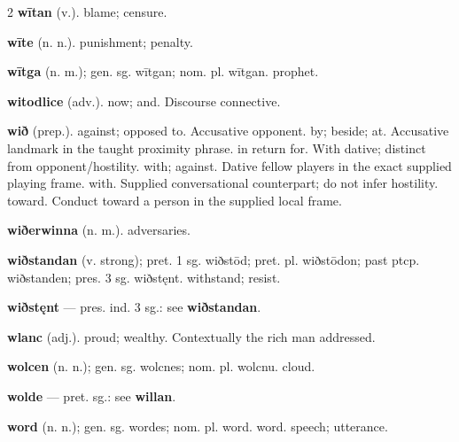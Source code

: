 \begin{multicols*}{2}
\textbf{wītan} (v.). blame; censure.\par
\textbf{wīte} (n. n.). punishment; penalty.\par
\textbf{wītga} (n. m.); gen. sg. wītgan; nom. pl. wītgan. prophet.\par
\textbf{witodlice} (adv.). now; and. Discourse connective.\par
\textbf{wið} (prep.). against; opposed to. Accusative opponent. by; beside; at. Accusative landmark in the taught proximity phrase. in return for. With dative; distinct from opponent/hostility. with; against. Dative fellow players in the exact supplied playing frame. with. Supplied conversational counterpart; do not infer hostility. toward. Conduct toward a person in the supplied local frame.\par
\textbf{wiðerwinna} (n. m.). adversaries.\par
\textbf{wiðstandan} (v. strong); pret. 1 sg. wiðstōd; pret. pl. wiðstōdon; past ptcp. wiðstanden; pres. 3 sg. wiðstęnt. withstand; resist.\par
\textbf{wiðstęnt} — pres. ind. 3 sg.: see \textbf{wiðstandan}.\par
\textbf{wlanc} (adj.). proud; wealthy. Contextually the rich man addressed.\par
\textbf{wolcen} (n. n.); gen. sg. wolcnes; nom. pl. wolcnu. cloud.\par
\textbf{wolde} — pret. sg.: see \textbf{willan}.\par
\textbf{word} (n. n.); gen. sg. wordes; nom. pl. word. word. speech; utterance.\par

\end{multicols*}
